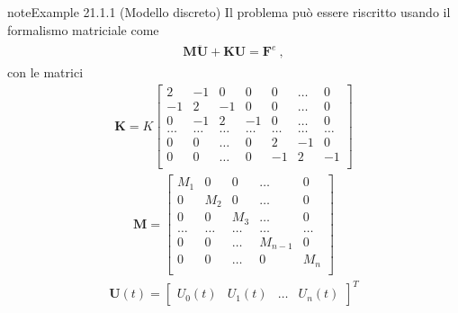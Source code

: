 \documentclass[letterpaper,10pt,italian]{jupyterBook}
\begin{document}
\begin{sphinxadmonition}{note}{Example 21.1.1 (Modello discreto)}
\sphinxAtStartPar
{} Il problema può essere riscritto usando il formalismo matriciale come
\begin{equation*}
\begin{split}\begin{aligned}
  \mathbf{M} \ddot{\mathbf{U}} + \mathbf{K} \mathbf{U} = \mathbf{F}^e \ ,
\end{aligned}\end{split}
\end{equation*}
\sphinxAtStartPar
con le matrici
\begin{equation*}
\begin{split}\mathbf{K} = K \begin{bmatrix}
   2    & -1    &  0    &  0    & 0     & \dots & 0     \\
  -1    &  2    & -1    &  0    & 0     & \dots & 0     \\ 
   0    & -1    &  2    & -1    & 0     & \dots & 0     \\
  \dots & \dots & \dots & \dots & \dots & \dots & \dots \\
   0    & 0     & \dots & 0     &    2  & -1    &  0    \\  
   0    & 0     & \dots & 0     &   -1  &  2    & -1    \\  
\end{bmatrix}\end{split}
\end{equation*}\begin{equation*}
\begin{split}\mathbf{M} = \begin{bmatrix}
   M_1  &  0    &  0    &  \dots   & 0     \\
   0    &  M_2  &  0    &  \dots   & 0     \\ 
   0    &  0    &  M_3  &  \dots   & 0     \\
  \dots & \dots & \dots &  \dots   & \dots \\
   0    & 0     & \dots &  M_{n-1} & 0     \\  
   0    & 0     & \dots &  0       & M_n   \\  
\end{bmatrix}\end{split}
\end{equation*}\begin{equation*}
\begin{split}\mathbf{U}(t) = \begin{bmatrix} U_0(t) & U_1(t) & \dots & U_n(t) \end{bmatrix}^T\end{split}

\end{equation*}
\end{sphinxadmonition}
\end{document}
